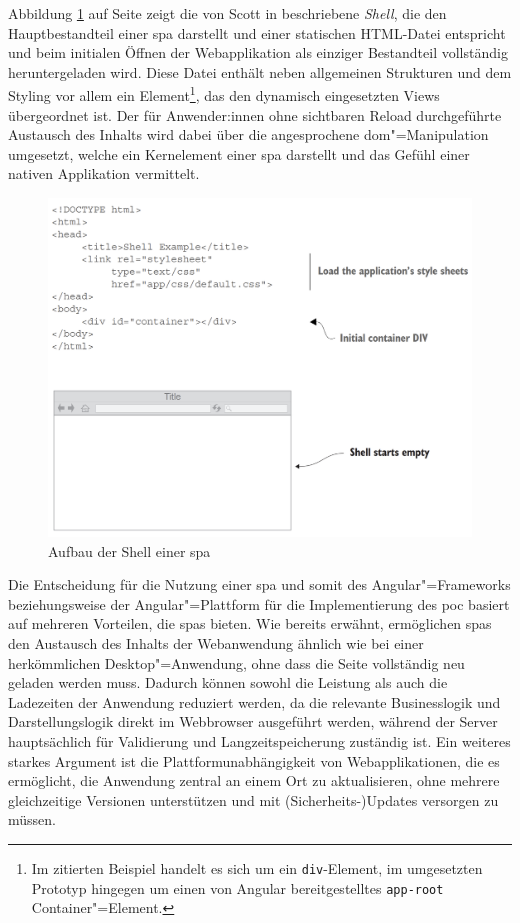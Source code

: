\documentclass[a4paper,12pt,twoside,numbers=noendperiod]{scrreprt}
\begin{document}
Abbildung \ref{fig:scott-spa-shell} auf Seite \pageref{fig:scott-spa-shell} zeigt die von Scott in \cite{scott_spa_2015} beschriebene \textit{Shell}, die den Hauptbestandteil einer \ac{spa} darstellt und einer statischen HTML-Datei entspricht und beim initialen Öffnen der Webapplikation als einziger Bestandteil vollständig heruntergeladen wird. Diese Datei enthält neben allgemeinen Strukturen und dem Styling vor allem ein Element\footnote{Im zitierten Beispiel handelt es sich um ein \texttt{div}-Element, im umgesetzten Prototyp hingegen um einen von Angular bereitgestelltes \texttt{app-root} Container"=Element.}, das den dynamisch eingesetzten Views übergeordnet ist. Der für Anwender:innen ohne sichtbaren Reload durchgeführte Austausch des Inhalts wird dabei über die angesprochene \ac{dom}"=Manipulation umgesetzt, welche ein Kernelement einer \ac{spa} darstellt und das Gefühl einer nativen Applikation vermittelt. \cite[8, 10\psqq]{scott_spa_2015}

\begin{figure}[ht]
    \centering
    \includegraphics[width=.8\linewidth]{thesis/images/Scott_SPA-Shell.png}
    \caption[Aufbau der Shell einer \acs{spa}]{Aufbau der Shell einer \acs{spa} \cite[8]{scott_spa_2015}}
    \label{fig:scott-spa-shell}
\end{figure}

Die Entscheidung für die Nutzung einer \ac{spa} und somit des Angular"=Frameworks beziehungsweise der Angular"=Plattform für die Implementierung des \ac{poc} basiert auf mehreren Vorteilen, die \acp{spa} bieten. Wie bereits erwähnt, ermöglichen \acp{spa} den Austausch des Inhalts der Webanwendung ähnlich wie bei einer herkömmlichen Desktop"=Anwendung, ohne dass die Seite vollständig neu geladen werden muss. Dadurch können sowohl die Leistung als auch die Ladezeiten der Anwendung reduziert werden, da die relevante Businesslogik und Darstellungslogik direkt im Webbrowser ausgeführt werden, während der Server hauptsächlich für Validierung und Langzeitspeicherung zuständig ist. Ein weiteres starkes Argument ist die Plattformunabhängigkeit von Webapplikationen, die es ermöglicht, die Anwendung zentral an einem Ort zu aktualisieren, ohne mehrere gleichzeitige Versionen unterstützen und mit (Sicherheits-)Updates versorgen zu müssen. \cite[20\psq]{mikowski_single_2013}
\end{document}
